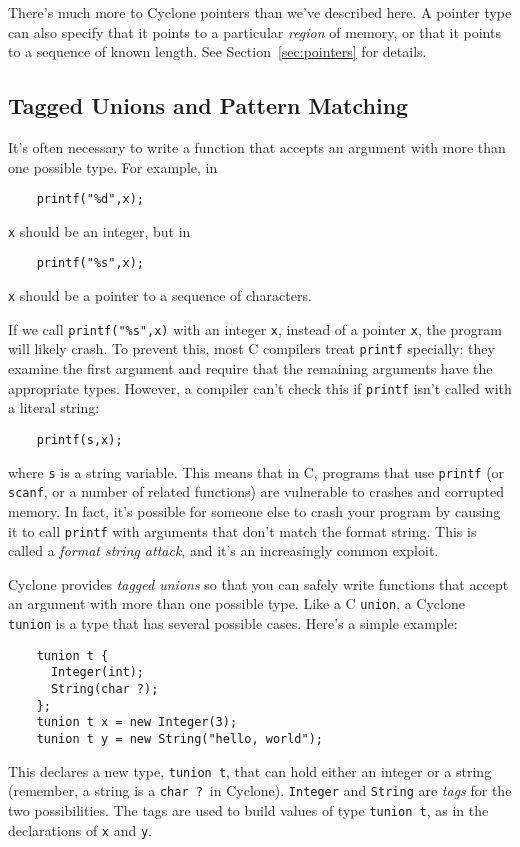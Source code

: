 There's much more to Cyclone pointers than we've described here.
A pointer type can also specify that it points to a particular
\emph{region} of memory, or that it points to a sequence of known
length.  See Section~\ref{sec:pointers} for details.

\subsection{Tagged Unions and Pattern Matching}

It's often necessary to write a function that accepts an argument with
more than one possible type.  For example, in
\begin{verbatim}
    printf("%d",x);
\end{verbatim}
\texttt{x} should be an integer, but in
\begin{verbatim}
    printf("%s",x);
\end{verbatim}
\texttt{x} should be a pointer to a sequence of characters.

If we call \texttt{printf("\%s",x)} with an integer \texttt{x},
instead of a pointer \texttt{x}, the program will likely crash.
To prevent this, most C compilers treat \texttt{printf} specially:
they examine the first argument and require that the remaining
arguments have the appropriate types.  However, a compiler can't check
this if \texttt{printf} isn't called with a literal string:
\begin{verbatim}
    printf(s,x);
\end{verbatim}
where \texttt{s} is a string variable.  This means that in C, programs
that use \texttt{printf} (or \texttt{scanf}, or a number of related
functions) are vulnerable to crashes and corrupted memory.  In fact,
it's possible for someone else to crash your program by causing it to
call \texttt{printf} with arguments that don't match the format
string.  This is called a \emph{format string attack}, and it's an
increasingly common exploit.

Cyclone provides \emph{tagged unions} so that you can safely write
functions that accept an argument with more than one possible type.
Like a C \texttt{union}, a Cyclone \texttt{tunion} is a type that has
several possible cases.  Here's a simple example:
\begin{verbatim}
    tunion t {
      Integer(int);
      String(char ?);
    };
    tunion t x = new Integer(3);
    tunion t y = new String("hello, world");
\end{verbatim}
This declares a new type, \texttt{tunion t}, that can hold either an
integer or a string (remember, a string is a \texttt{char ?}\ in
Cyclone).  \texttt{Integer} and \texttt{String} are \emph{tags} for
the two possibilities.  The tags are used to build values of type
\texttt{tunion t}, as in the declarations of \texttt{x} and
\texttt{y}.

